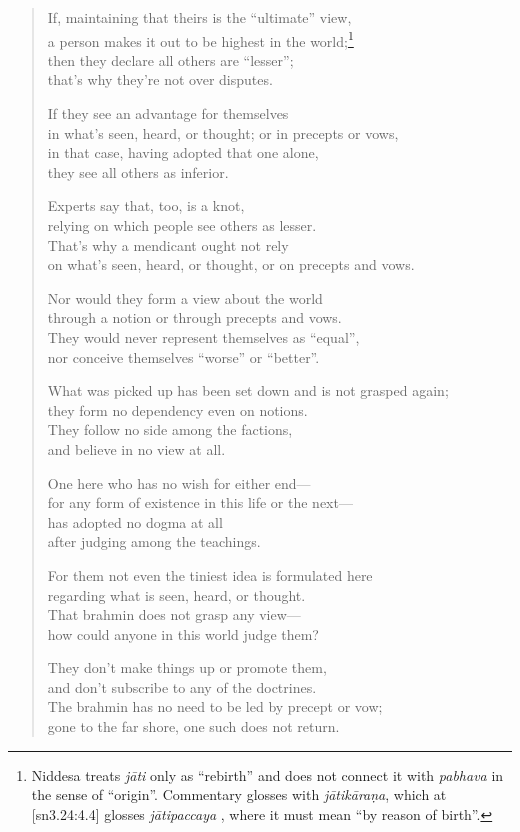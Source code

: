 \documentclass[12pt,openany]{book}%
\begin{document}
\begin{verse}%
If, maintaining that theirs is the “ultimate” view, \\
a person makes it out to be highest in the world;\footnote{Niddesa treats \textit{\textsanskrit{jāti}} only as “rebirth” and does not connect it with \textit{pabhava} in the sense of “origin”. Commentary glosses with \textit{\textsanskrit{jātikāraṇa}}, which at [sn3.24:4.4] glosses \textit{\textsanskrit{jātipaccaya}} , where it must mean “by reason of birth”. } \\
then they declare all others are “lesser”; \\
that’s why they’re not over disputes. 

If they see an advantage for themselves \\
in what’s seen, heard, or thought; or in precepts or vows, \\
in that case, having adopted that one alone, \\
they see all others as inferior. 

Experts say that, too, is a knot, \\
relying on which people see others as lesser. \\
That’s why a mendicant ought not rely \\
on what’s seen, heard, or thought, or on precepts and vows. 

Nor would they form a view about the world \\
through a notion or through precepts and vows. \\
They would never represent themselves as “equal”, \\
nor conceive themselves “worse” or “better”. 

What was picked up has been set down and is not grasped again; \\
they form no dependency even on notions. \\
They follow no side among the factions, \\
and believe in no view at all. 

One here who has no wish for either end—\\
for any form of existence in this life or the next—\\
has adopted no dogma at all \\
after judging among the teachings. 

For them not even the tiniest idea is formulated here \\
regarding what is seen, heard, or thought. \\
That brahmin does not grasp any view—\\
how could anyone in this world judge them? 

They don’t make things up or promote them, \\
and don’t subscribe to any of the doctrines. \\
The brahmin has no need to be led by precept or vow; \\
gone to the far shore, one such does not return. 

%
\end{verse}
\end{document}

